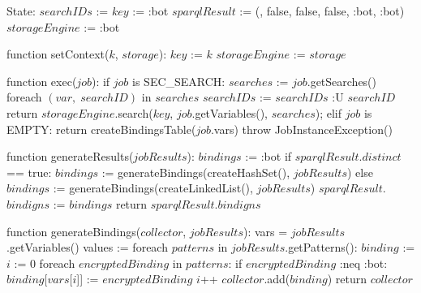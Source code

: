 State:
    $searchIDs$ := {}
    $key$ := :bot
    $sparqlResult$ := ({}, false, false, false, :bot, :bot)
    $storageEngine$ := :bot

function setContext($k$, $storage$):
    $key$ := $k$
    $storageEngine$ := $storage$

function exec($job$):
    if $job$ is SEC_SEARCH:
        $searches$ := $job$.getSearches()
        foreach $(var, \; searchID)$ in $searches$
            $searchIDs$ :=  $searchIDs$ :U { $searchID$ }
        return $storageEngine$.search($key$, $job$.getVariables(), $searches$);
    elif $job$ is EMPTY:
        return createBindingsTable($job$.vars)
    throw JobInstanceException()

function generateResults($jobResults$):
    $bindings$ := :bot
    if $sparqlResult$.$distinct$ == true:
        $bindings$ := generateBindings(createHashSet(), $jobResults$)
    else
        $bindings$ := generateBindings(createLinkedList(), $jobResults$)
    $sparqlResult$.$bindigns$ := $bindings$
    return $sparqlResult$.$bindigns$

function generateBindings($collector$, $jobResults$):
    vars = $jobResults$.getVariables()
    values := {}
    foreach $patterns$ in $jobResults$.getPatterns():
        $binding$ := {}
        $i$ := 0
        foreach $encryptedBinding$ in $patterns$:
            if $encryptedBinding$ :neq :bot:
                $binding$[$vars$[$i$]] := $encryptedBinding$
            $i$++
        $collector$.add($binding$)
    return $collector$